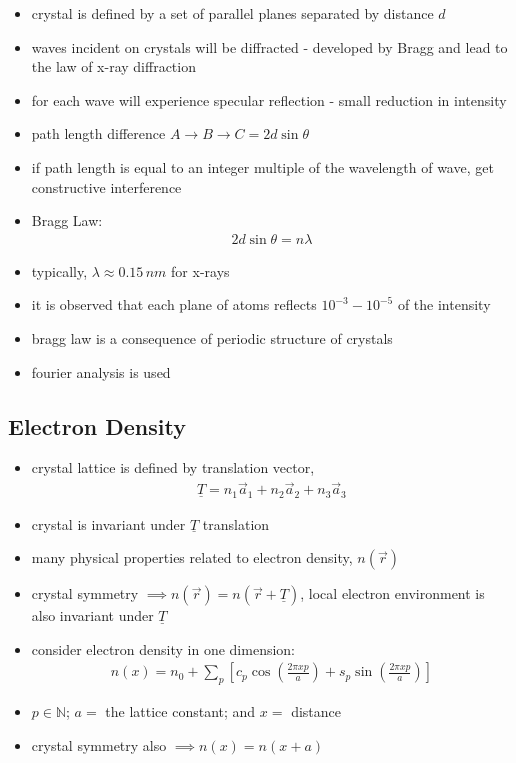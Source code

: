 \documentclass[a4paper,11pt,normalem]{article}
\begin{document}
\begin{itemize}
    \item crystal is defined by a set of parallel planes separated by distance \(d\)
    \item waves incident on crystals will be diffracted - developed by Bragg and lead to the law of x-ray diffraction
    \item for each wave will experience specular reflection - small reduction in intensity
    \item path length difference \(A \to B \to C = 2d\sin\theta\)
    \item if path length is equal to an integer multiple of the wavelength of wave, get constructive interference
    \item Bragg Law:
        \begin{align*}
            2d\sin\theta = n\lambda
        \end{align*}
    \item typically, \(\lambda \approx 0.15\,nm\) for x-rays
    \item it is observed that each plane of atoms reflects \(10^{-3} - 10^{-5}\) of the intensity
    \item bragg law is a consequence of periodic structure of crystals
    \item fourier analysis is used
\end{itemize}

\subsection{Electron Density}

\begin{itemize}
    \item crystal lattice is defined by translation vector,
        \begin{align*}
            \underline{T} = n_1\vec{a}_1 + n_2\vec{a}_2 + n_3\vec{a}_3
        \end{align*}
    \item crystal is invariant under \(\underline{T}\) translation
    \item many physical properties related to electron density, \(n(\vec{r})\)
    \item crystal symmetry \(\implies n(\vec{r}) = n(\vec{r} + \underline{T})\), local electron environment is also invariant under \(\underline{T}\)
    \item consider electron density in one dimension:
        \begin{align*}
            n(x) = n_0 + \sum_p \left[c_p\cos\left(\frac{2\pi xp}{a}\right) + s_p\sin\left(\frac{2\pi xp}{a}\right)\right]
        \end{align*}
    \item \(p \in \mathbb{N}\); \(a =\) the lattice constant; and \(x =\) distance
    \item crystal symmetry also \(\implies n(x) = n(x + a)\)
\end{itemize}
\end{document}
